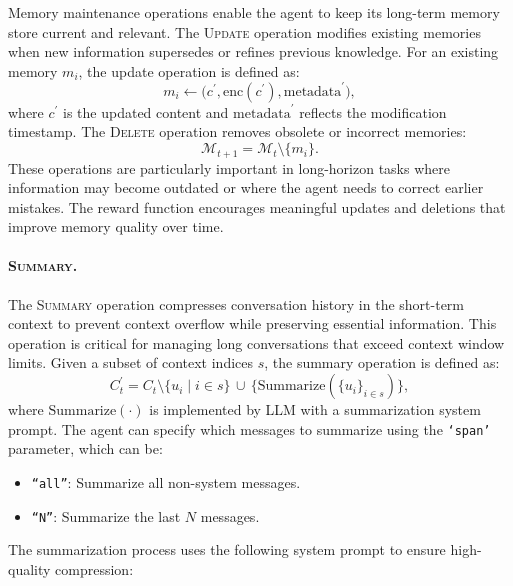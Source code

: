 Memory maintenance operations enable the agent to keep its long-term memory store current and relevant. The \textsc{Update} operation modifies existing memories when new information supersedes or refines previous knowledge. For an existing memory $m_i$, the update operation is defined as:
\begin{equation}
m_i \leftarrow \big(c^{\prime}, \text{enc}(c^{\prime}), \text{metadata}^{\prime}\big),
\end{equation}
where $c^{\prime}$ is the updated content and $\text{metadata}^{\prime}$ reflects the modification timestamp. The \textsc{Delete} operation removes obsolete or incorrect memories:
\begin{equation}
\mathcal{M}_{t+1} = \mathcal{M}_t \setminus \{m_i\}.
\end{equation}
These operations are particularly important in long-horizon tasks where information may become outdated or where the agent needs to correct earlier mistakes. The reward function encourages meaningful updates and deletions that improve memory quality over time.


\paragraph{\textsc{Summary}.}
The \textsc{Summary} operation compresses conversation history in the short-term context to prevent context overflow while preserving essential information. This operation is critical for managing long conversations that exceed context window limits. Given a subset of context indices $s$, the summary operation is defined as:
\begin{equation}
C_t^{\prime}
= C_t \setminus \{u_i \mid i \in s\}
\, \cup \, \{\text{Summarize}(\{u_i\}_{i \in s})\},
\end{equation}
where $\text{Summarize}(\cdot)$ is implemented by LLM with a summarization system prompt. The agent can specify which messages to summarize using the \texttt{`span'} parameter, which can be:
\begin{itemize}
\item \texttt{``all''}: Summarize all non-system messages.
\item \texttt{``N''}: Summarize the last $N$ messages.
\end{itemize}
The summarization process uses the following system prompt to ensure high-quality compression:

